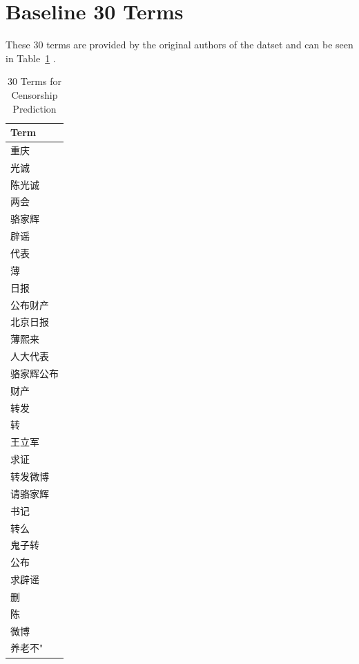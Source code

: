 \documentclass{sig-alternate-05-2015}
\begin{document}
\section{Baseline 30 Terms}
These 30 terms are provided by the original authors of the datset and can be seen in Table~\ref{tab:terms} \cite{Fu2013a}.
\begin{table}
  \centering
  \begin{tabular}{l}
    Term \\
    \hline
    重庆\\光诚\\陈光诚\\两会\\骆家辉\\辟谣\\代表\\薄\\日报\\公布财产\\北京日报\\薄熙来\\人大代表\\骆家辉公布\\财产\\转发\\转\\王立军\\求证\\转发微博\\请骆家辉\\书记\\转么\\鬼子转\\公布\\求辟谣\\删\\陈\\微博\\养老不"
  \end{tabular}
  \caption{30 Terms for Censorship Prediction}
  \label{tab:terms}
\end{table}
\end{document}
